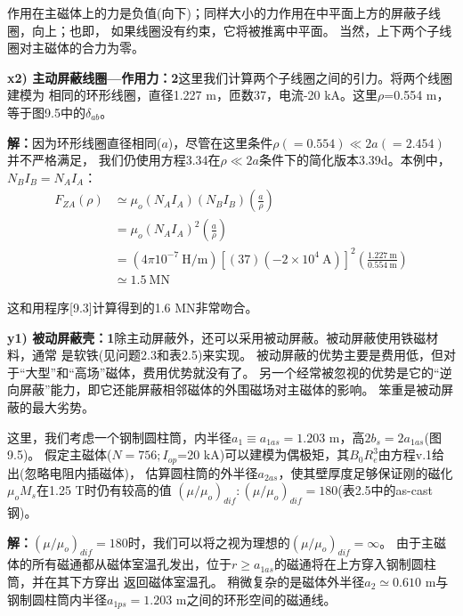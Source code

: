 作用在主磁体上的力是负值(向下)；同样大小的力作用在中平面上方的屏蔽子线圈，向上；也即，
如果线圈没有约束，它将被推离中平面。
当然，上下两个子线圈对主磁体的合力为零。

\textbf{x2) 主动屏蔽线圈---作用力：2}\qquad 这里我们计算两个子线圈之间的引力。将两个线圈建模为
相同的环形线圈，直径1.227 m，匝数37，电流-20 kA。这里$\rho$=0.554 m，等于图9.5中的$\delta_{ab}$。

\textbf{解：}因为环形线圈直径相同($a$)，尽管在这里条件$\rho(=0.554)\ll 2a(=2.454)$并不严格满足，
我们仍使用方程3.34在$\rho\ll 2a$条件下的简化版本3.39d。本例中，$N_B I_B=N_A I_A$：
\begin{align*}%
F_{ZA}(\rho)&\simeq\mu_o(N_AI_A)(N_BI_B)(\frac{a}{\rho})\\ \tag{3.39d}
&=\mu_o(N_AI_A)^2(\frac{a}{\rho})\\
&=(4\pi10^{-7}\ \mathrm{H/m})[(37)(-2\times 10^4\ \mathrm{A})]^2(\frac{1.227\ \mathrm{m}}{0.554\ \mathrm{m}})\\
&\simeq 1.5\ \mathrm{MN}
\end{align*}

这和用程序[9.3]计算得到的1.6 MN非常吻合。

\textbf{y1) 被动屏蔽壳：1}\qquad 除主动屏蔽外，还可以采用被动屏蔽。被动屏蔽使用铁磁材料，通常
是软铁(见问题2.3和表2.5)来实现。
被动屏蔽的优势主要是费用低，但对于“大型”和“高场”磁体，费用优势就没有了。
另一个经常被忽视的优势是它的“逆向屏蔽”能力，即它还能屏蔽相邻磁体的外围磁场对主磁体的影响。
笨重是被动屏蔽的最大劣势。

这里，我们考虑一个钢制圆柱筒，内半径$a_1\equiv a_{1as}=1.203$ m，高$2b_s=2a_{1as}$(图9.5)。
假定主磁体($N=756;I_{op}$=20 kA)可以建模为偶极矩，其$B_0R_e^3$由方程v.1给出(忽略电阻内插磁体)，
估算圆柱筒的外半径$a_{2as}$，使其壁厚度足够保证刚的磁化$\mu_o M_s$在1.25 T时仍有较高的值
$(\mu/\mu_o)_{dif}:(\mu/\mu_o)_{dif}=180$(表2.5中的as-cast钢)。

\textbf{解：}$(\mu/\mu_o)_{dif}=180$时，我们可以将之视为理想的$(\mu/\mu_o)_{dif}=\infty$。
由于主磁体的所有磁通都从磁体室温孔发出，位于$r\ge a_{1as}$的磁通将在上方穿入钢制圆柱筒，并在其下方穿出
返回磁体室温孔。
稍微复杂的是磁体外半径$a_2\simeq0.610$ m与钢制圆柱筒内半径$a_{1ps}=1.203$ m之间的环形空间的磁通线。


